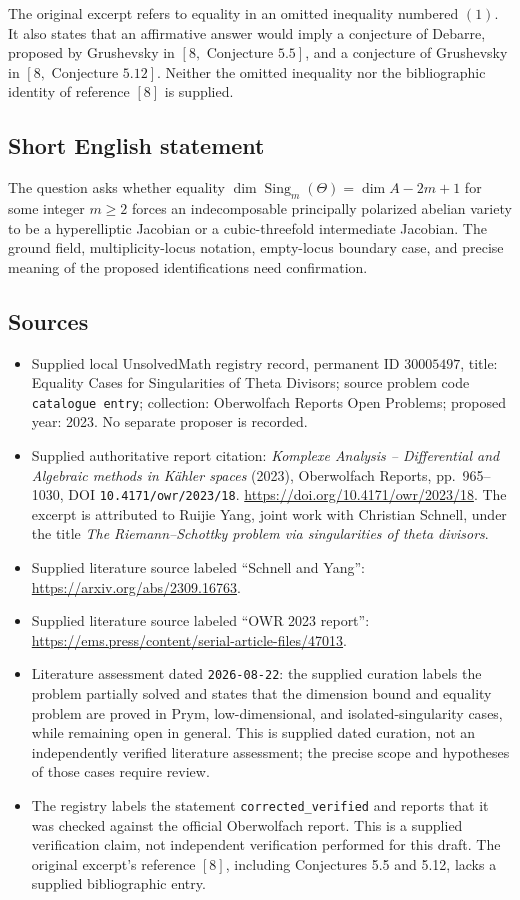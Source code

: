 \documentclass[11pt]{article}
\begin{document}
The original excerpt refers to equality in an omitted inequality numbered \((1)\). It also states that an affirmative answer would imply a conjecture of Debarre, proposed by Grushevsky in \([8,\text{ Conjecture }5.5]\), and a conjecture of Grushevsky in \([8,\text{ Conjecture }5.12]\). Neither the omitted inequality nor the bibliographic identity of reference \([8]\) is supplied.
\subsection{Short English statement}
The question asks whether equality \(\dim\operatorname{Sing}_m(\Theta)=\dim A-2m+1\) for some integer \(m\geq2\) forces an indecomposable principally polarized abelian variety to be a hyperelliptic Jacobian or a cubic-threefold intermediate Jacobian. The ground field, multiplicity-locus notation, empty-locus boundary case, and precise meaning of the proposed identifications need confirmation.
\subsection{Sources}
\begin{itemize}
\item Supplied local UnsolvedMath registry record, permanent ID \(30005497\), title: Equality Cases for Singularities of Theta Divisors; source problem code \texttt{catalogue entry}; collection: Oberwolfach Reports Open Problems; proposed year: 2023. No separate proposer is recorded.
\item Supplied authoritative report citation: \emph{Komplexe Analysis -- Differential and Algebraic methods in Kähler spaces} (2023), Oberwolfach Reports, pp.\ 965--1030, DOI \texttt{10.4171/owr/2023/18}. \url{https://doi.org/10.4171/owr/2023/18}. The excerpt is attributed to Ruijie Yang, joint work with Christian Schnell, under the title \emph{The Riemann--Schottky problem via singularities of theta divisors}.
\item Supplied literature source labeled ``Schnell and Yang'': \url{https://arxiv.org/abs/2309.16763}.
\item Supplied literature source labeled ``OWR 2023 report'': \url{https://ems.press/content/serial-article-files/47013}.
\item Literature assessment dated \texttt{2026-08-22}: the supplied curation labels the problem partially solved and states that the dimension bound and equality problem are proved in Prym, low-dimensional, and isolated-singularity cases, while remaining open in general. This is supplied dated curation, not an independently verified literature assessment; the precise scope and hypotheses of those cases require review.
\item The registry labels the statement \texttt{corrected\_verified} and reports that it was checked against the official Oberwolfach report. This is a supplied verification claim, not independent verification performed for this draft. The original excerpt's reference \([8]\), including Conjectures 5.5 and 5.12, lacks a supplied bibliographic entry.
\end{itemize}
\end{document}

